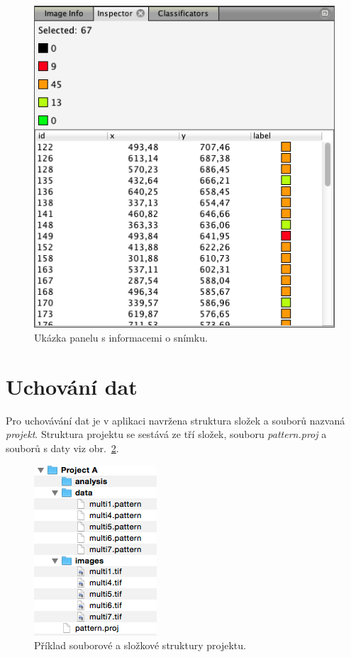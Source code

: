 \documentclass[11pt,twoside,a4paper,table]{book}
\begin{document}
\begin{figure}[h]
	\centering
	\includegraphics[scale=0.5]{figures/app_inspector.png}
	\caption{Ukázka panelu s informacemi o snímku.}
	\label{fig:app_inspector}
\end{figure}

\section{Uchování dat}
\label{sec:uchovani_dat}
Pro uchovávání dat je v aplikaci navržena struktura složek a souborů nazvaná \textit{projekt}. Struktura projektu se sestává ze tří složek, souboru \textit{pattern.proj} a souborů s daty viz obr.~\ref{fig:project_structure}.

\begin{figure}
	\centering
	\includegraphics[scale=1]{figures/app_project_structure.png}
	\caption{Příklad souborové a složkové struktury projektu.}
	\label{fig:project_structure}
\end{figure}
\end{document}
